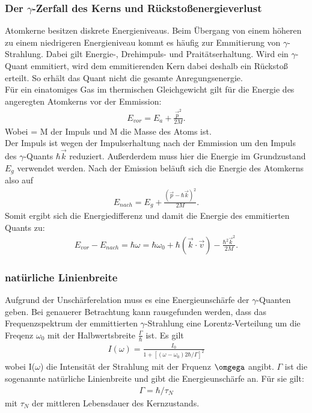 \documentclass[a4paper,twoside,final]{article}
\begin{document}
\subsubsection{Der $\gamma$-Zerfall des Kerns und Rückstoßenergieverlust}\label{sec:Rückstoß}
Atomkerne besitzen diskrete Energieniveaus. Beim Übergang von einem höheren zu einem niedrigeren Energieniveau kommt es häufig zur Emmitierung von $\gamma$-Strahlung. Dabei gilt Energie-, Drehimpuls- und Praitätserhaltung. Wird ein $\gamma$-Quant emmitiert, wird dem emmitierenden Kern dabei deshalb ein Rückstoß erteilt. So erhält das Quant nicht die gesamte Anregungsenergie. \\
Für ein einatomiges Gas im thermischen Gleichgewicht gilt für die Energie des angeregten Atomkerns vor der Emmission:
\begin{align}
E_{vor} = E_a+\frac{\vec{p}^2}{2M}.
\end{align}
Wobei  = M der Impuls und M die Masse des Atoms ist. \\
Der Impuls ist wegen der Impulserhaltung nach der Emmission um den Impuls des $\gamma$-Quants $\hbar\vec{k}$ reduziert. Außerderdem muss hier die Energie im Grundzustand $E_g$ verwendet werden. Nach der Emission beläuft sich die Energie des Atomkerns also auf
\begin{align}
E_{nach} = E_g+\frac{(\vec{p}-\hbar\vec{k})^2}{2M}.
\end{align}
Somit ergibt sich die Energiedifferenz und damit die Energie des emmitierten Quants zu:
\begin{align}\label{equ:EnergieGamma}
E_{vor}-E_{nach}= \hbar \omega = \hbar \omega_0 + \hbar (\vec{k}\cdot\vec{v})-\frac{\hbar^2\vec{k}^2}{2M}.
\end{align}

\subsubsection{natürliche Linienbreite}
Aufgrund der Unschärferelation muss es eine Energieunschärfe der $\gamma$-Quanten geben. Bei genauerer Betrachtung kann rausgefunden werden, dass das Frequenzspektrum der emmittierten $\gamma$-Strahlung eine Lorentz-Verteilung um die Freqenz $\omega_0$ mit der Halbwertsbreite $\frac{\Gamma}{\hbar}$ ist. Es gilt
\begin{align}
I(\omega) = \frac{I_0}{1+[(\omega-\omega_0)2\hbar/\Gamma]^2}
\end{align}
wobei I($\omega$) die Intensität der Strahlung mit der Frquenz $\omgega$ angibt.
$\Gamma$ ist die sogenannte natürliche Linienbreite und gibt die Energieunschärfe an. Für sie gilt:
\begin{align}
\Gamma = \hbar / \tau_N
\end{align}
mit $\tau_N$ der mittleren Lebensdauer des Kernzustands.
\end{document}
